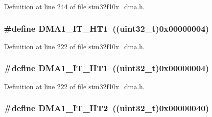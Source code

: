 Definition at line 244 of file stm32f10x\+\_\+dma.\+h.

\subsubsection[{\texorpdfstring{D\+M\+A1\+\_\+\+I\+T\+\_\+\+H\+T1}{DMA1_IT_HT1}}]{\setlength{\rightskip}{0pt plus 5cm}\#define D\+M\+A1\+\_\+\+I\+T\+\_\+\+H\+T1~(({\bf uint32\+\_\+t})0x00000004)}\hypertarget{group___d_m_a__interrupts__definition_gaea8c98e79c8cb420c81f7380a4c8e1da}{}\label{group___d_m_a__interrupts__definition_gaea8c98e79c8cb420c81f7380a4c8e1da}


Definition at line 222 of file stm32f10x\+\_\+dma.\+h.

\subsubsection[{\texorpdfstring{D\+M\+A1\+\_\+\+I\+T\+\_\+\+H\+T1}{DMA1_IT_HT1}}]{\setlength{\rightskip}{0pt plus 5cm}\#define D\+M\+A1\+\_\+\+I\+T\+\_\+\+H\+T1~(({\bf uint32\+\_\+t})0x00000004)}\hypertarget{group___d_m_a__interrupts__definition_gaea8c98e79c8cb420c81f7380a4c8e1da}{}\label{group___d_m_a__interrupts__definition_gaea8c98e79c8cb420c81f7380a4c8e1da}


Definition at line 222 of file stm32f10x\+\_\+dma.\+h.

\subsubsection[{\texorpdfstring{D\+M\+A1\+\_\+\+I\+T\+\_\+\+H\+T2}{DMA1_IT_HT2}}]{\setlength{\rightskip}{0pt plus 5cm}\#define D\+M\+A1\+\_\+\+I\+T\+\_\+\+H\+T2~(({\bf uint32\+\_\+t})0x00000040)}\hypertarget{group___d_m_a__interrupts__definition_gab2d608582c350ed00412f7a09fe10ae7}{}\label{group___d_m_a__interrupts__definition_gab2d608582c350ed00412f7a09fe10ae7}



